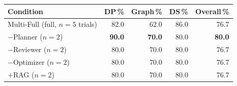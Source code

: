 \begin{tabular}{@{}lrrrr@{}}
\toprule
Condition & DP\,\% & Graph\,\% & DS\,\% & Overall\,\% \\
\midrule
Multi-Full (full, $n{=}5$ trials) & 82.0 & 62.0 & 86.0 & 76.7 \\
\quad $-$Planner ($n{=}2$)        & \textbf{90.0} & \textbf{70.0} & 80.0 & \textbf{80.0} \\
\quad $-$Reviewer ($n{=}2$)       & 80.0 & 70.0 & 80.0 & 76.7 \\
\quad $-$Optimizer ($n{=}2$)      & 80.0 & 70.0 & 80.0 & 76.7 \\
\quad $+$RAG ($n{=}2$)            & 80.0 & 70.0 & 80.0 & 76.7 \\
\bottomrule
\end{tabular}
